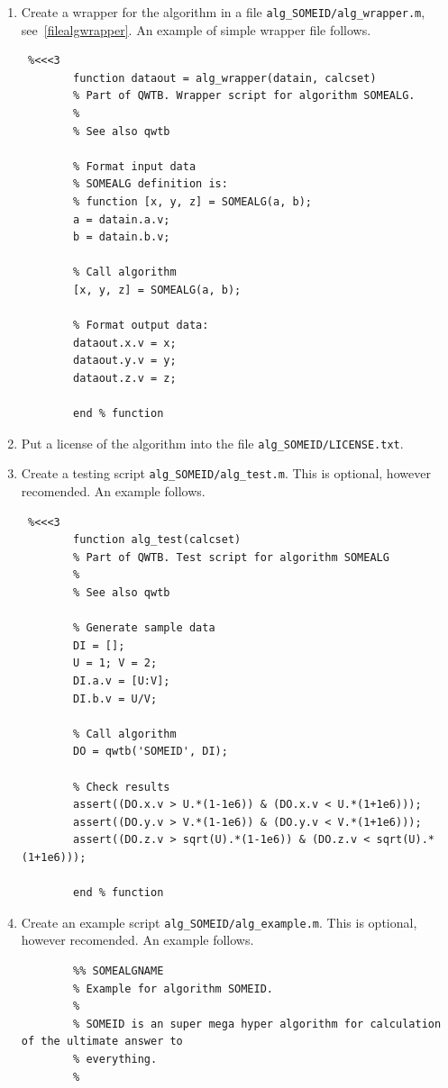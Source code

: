 \documentclass[12pt,a4paper,oneside]{report} %
\begin{document}
\begin{enumerate}
        \item Create a wrapper for the algorithm in a file {\tt alg\_SOMEID/alg\_wrapper.m}, see~\ref{filealgwrapper}. An example of simple wrapper
        file follows.
        \begin{lstlisting} %<<<3
        function dataout = alg_wrapper(datain, calcset)
        % Part of QWTB. Wrapper script for algorithm SOMEALG.
        %
        % See also qwtb

        % Format input data
        % SOMEALG definition is:
        % function [x, y, z] = SOMEALG(a, b);
        a = datain.a.v;
        b = datain.b.v;

        % Call algorithm
        [x, y, z] = SOMEALG(a, b);

        % Format output data:
        dataout.x.v = x;
        dataout.y.v = y;
        dataout.z.v = z;

        end % function
        \end{lstlisting} %

        \item Put a license of the algorithm into the file {\tt alg\_SOMEID/LICENSE.txt}.

        \item Create a testing script {\tt alg\_SOMEID/alg\_test.m}. This is optional, however
        recomended. An example follows.
        \begin{lstlisting} %<<<3
        function alg_test(calcset)
        % Part of QWTB. Test script for algorithm SOMEALG
        %
        % See also qwtb

        % Generate sample data 
        DI = [];
        U = 1; V = 2;
        DI.a.v = [U:V];
        DI.b.v = U/V;

        % Call algorithm
        DO = qwtb('SOMEID', DI);

        % Check results 
        assert((DO.x.v > U.*(1-1e6)) & (DO.x.v < U.*(1+1e6)));
        assert((DO.y.v > V.*(1-1e6)) & (DO.y.v < V.*(1+1e6)));
        assert((DO.z.v > sqrt(U).*(1-1e6)) & (DO.z.v < sqrt(U).*(1+1e6)));

        end % function
        \end{lstlisting}

        \item Create an example script {\tt alg\_SOMEID/alg\_example.m}. This is optional, however
        recomended. An example follows.
        \begin{lstlisting}
        %% SOMEALGNAME
        % Example for algorithm SOMEID.
        %
        % SOMEID is an super mega hyper algorithm for calculation of the ultimate answer to
        % everything.
        %


\end{lstlisting}
\end{enumerate}
\end{document}
